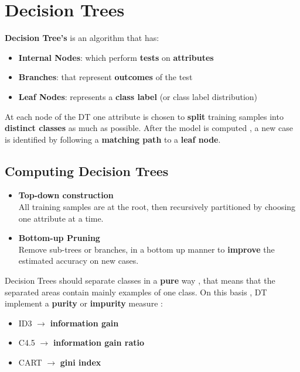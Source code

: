 \newpage
\section{Decision Trees}
\textbf{Decision Tree's} is an algorithm that has:
\begin{itemize}
\item \textbf{Internal Nodes}: which perform \textbf{tests} on \textbf{attributes}
\item \textbf{Branches}: that represent \textbf{outcomes} of the test
\item \textbf{Leaf Nodes}: represents a \textbf{class label} (or class label distribution)
\end{itemize}
At each node of the DT one attribute is chosen to \textbf{split} training samples into \textbf{distinct classes} as much as possible. After the model is computed , a new case is identified by following a \textbf{matching path} to a \textbf{leaf node}.

\subsection{Computing Decision Trees}
\begin{itemize}
\item \textbf{Top-down construction}\\
All training samples are at the root, then recursively partitioned by choosing one attribute at a time.
\item \textbf{Bottom-up Pruning}\\
Remove sub-trees or branches, in a bottom up manner to \textbf{improve} the estimated accuracy on new cases.
\end{itemize}
Decision Trees should separate classes in a \textbf{pure} way , that means that the separated areas contain mainly examples of one class. On this basis , DT implement a \textbf{purity} or \textbf{impurity} measure :
\begin{itemize}
\item ID3 $\rightarrow$ \textbf{information gain}
\item C4.5 $\rightarrow$ \textbf{information gain ratio}
\item CART $\rightarrow$ \textbf{gini index}
\end{itemize}


